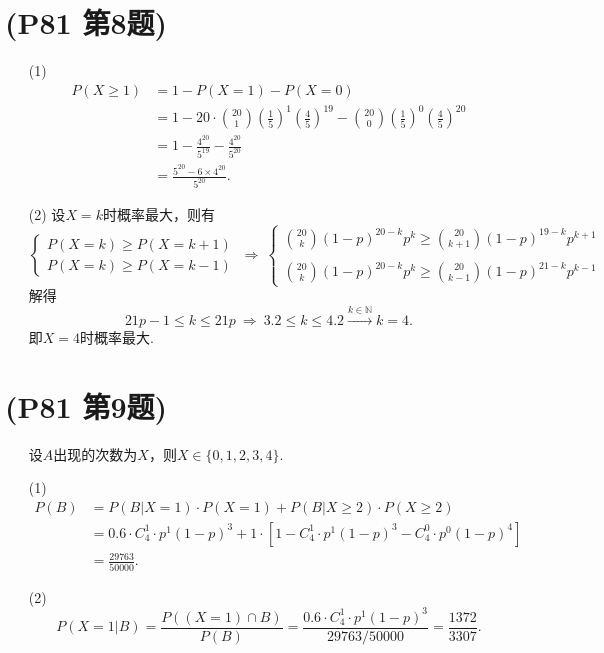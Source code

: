 \documentclass{article}
\begin{document}
\section{(P81 第8题)}  %
\begin{enumerate}
    \item [(1)]
    \begin{align*}
        P(X\geq 1)
        & =
        1-P(X=1)-P(X=0)\\
        & =
        1-20 \cdot \binom{20}{1} {\left(\frac{1}{5}\right)}^{1} {\left(\frac{4}{5}\right)}^{19}
        -\binom{20}{0} {\left(\frac{1}{5}\right)}^{0} {\left(\frac{4}{5}\right)}^{20}\\
        & =
        1-\displaystyle{\frac{4^{20}}{5^{19}}}-\displaystyle{\frac{4^{20}}{5^{20}}} \\
        & =
        \displaystyle{\frac{5^{20}-6\times 4^{20}}{5^{20}}}.
    \end{align*}
    \item [(2)]设$X=k$时概率最大，则有
    \[
        \begin{cases}
            P(X=k)\geq P(X=k+1)\\
            P(X=k)\geq P(X=k-1)
        \end{cases}
        \ \Rightarrow\ 
        \begin{cases}
            \displaystyle{\binom{20}{k} {(1-p)}^{20-k} p^{k} \geq \binom{20}{k+1} {(1-p)}^{19-k} p^{k+1}}\\
            \\
            \displaystyle{\binom{20}{k} {(1-p)}^{20-k} p^{k} \geq \binom{20}{k-1} {(1-p)}^{21-k} p^{k-1}}
        \end{cases}
    \]
    解得
    \[
        21p -1 \leq k \leq 21p
        \ \Rightarrow\ 
        3.2 \leq k \leq 4.2
        \xrightarrow{k\in \mathbb{N}}   
        k=4. 
    \]
    即$X=4$时概率最大.
\end{enumerate}

\section{(P81 第9题)}  %
\begin{enumerate}
    \item []设$A$出现的次数为$X$，则$X\in \{0,1,2,3,4\}$.
    \item [(1)]
    \begin{align*}
        P(B)
        & = 
        P(B|X=1) \cdot P(X=1) + P(B|X\geq 2) \cdot P(X\geq 2)\\
        & =
        0.6\cdot C_4^1 \cdot p^{1} {(1-p)}^{3} + 1\cdot \left[1- C_4^1 \cdot p^{1} {(1-p)}^{3} - C_4^0 \cdot p^{0} {(1-p)}^{4} \right]\\
        & =
        \displaystyle{\frac{29763}{50000}}.
    \end{align*}
    \item [(2)]
    \[
        P( X=1 | B )
        =
        \displaystyle{\frac{P((X=1)\cap B)}{P(B)}}
        =
        \displaystyle{\frac{0.6\cdot C_4^1 \cdot p^{1} {(1-p)}^{3}}{29763/ 50000}}
        =
        \displaystyle{\frac{1372}{3307}}.
    \]
\end{enumerate}
\end{document}
